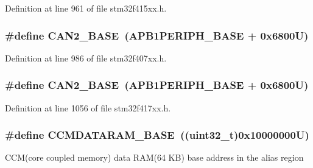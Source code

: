Definition at line 961 of file stm32f415xx.\+h.

\subsubsection[{\texorpdfstring{C\+A\+N2\+\_\+\+B\+A\+SE}{CAN2_BASE}}]{\setlength{\rightskip}{0pt plus 5cm}\#define C\+A\+N2\+\_\+\+B\+A\+SE~({\bf A\+P\+B1\+P\+E\+R\+I\+P\+H\+\_\+\+B\+A\+SE} + 0x6800\+U)}\hypertarget{group___peripheral__registers__structures_gaf7b8267b0d439f8f3e82f86be4b9fba1}{}\label{group___peripheral__registers__structures_gaf7b8267b0d439f8f3e82f86be4b9fba1}


Definition at line 986 of file stm32f407xx.\+h.

\subsubsection[{\texorpdfstring{C\+A\+N2\+\_\+\+B\+A\+SE}{CAN2_BASE}}]{\setlength{\rightskip}{0pt plus 5cm}\#define C\+A\+N2\+\_\+\+B\+A\+SE~({\bf A\+P\+B1\+P\+E\+R\+I\+P\+H\+\_\+\+B\+A\+SE} + 0x6800\+U)}\hypertarget{group___peripheral__registers__structures_gaf7b8267b0d439f8f3e82f86be4b9fba1}{}\label{group___peripheral__registers__structures_gaf7b8267b0d439f8f3e82f86be4b9fba1}


Definition at line 1056 of file stm32f417xx.\+h.

\subsubsection[{\texorpdfstring{C\+C\+M\+D\+A\+T\+A\+R\+A\+M\+\_\+\+B\+A\+SE}{CCMDATARAM_BASE}}]{\setlength{\rightskip}{0pt plus 5cm}\#define C\+C\+M\+D\+A\+T\+A\+R\+A\+M\+\_\+\+B\+A\+SE~((uint32\+\_\+t)0x10000000\+U)}\hypertarget{group___peripheral__registers__structures_gabea1f1810ebeac402164b42ab54bcdf9}{}\label{group___peripheral__registers__structures_gabea1f1810ebeac402164b42ab54bcdf9}
C\+C\+M(core coupled memory) data R\+A\+M(64 K\+B) base address in the alias region 

